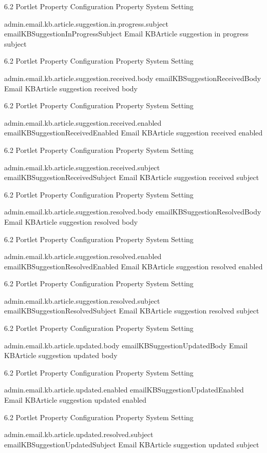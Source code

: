6.2 Portlet Property Configuration Property System Setting

admin.email.kb.article.suggestion.in.progress.subject
emailKBSuggestionInProgressSubject Email KBArticle suggestion in
progress subject

6.2 Portlet Property Configuration Property System Setting

admin.email.kb.article.suggestion.received.body
emailKBSuggestionReceivedBody Email KBArticle suggestion received body

6.2 Portlet Property Configuration Property System Setting

admin.email.kb.article.suggestion.received.enabled
emailKBSuggestionReceivedEnabled Email KBArticle suggestion received
enabled

6.2 Portlet Property Configuration Property System Setting

admin.email.kb.article.suggestion.received.subject
emailKBSuggestionReceivedSubject Email KBArticle suggestion received
subject

6.2 Portlet Property Configuration Property System Setting

admin.email.kb.article.suggestion.resolved.body
emailKBSuggestionResolvedBody Email KBArticle suggestion resolved body

6.2 Portlet Property Configuration Property System Setting

admin.email.kb.article.suggestion.resolved.enabled
emailKBSuggestionResolvedEnabled Email KBArticle suggestion resolved
enabled

6.2 Portlet Property Configuration Property System Setting

admin.email.kb.article.suggestion.resolved.subject
emailKBSuggestionResolvedSubject Email KBArticle suggestion resolved
subject

6.2 Portlet Property Configuration Property System Setting

admin.email.kb.article.updated.body emailKBSuggestionUpdatedBody Email
KBArticle suggestion updated body

6.2 Portlet Property Configuration Property System Setting

admin.email.kb.article.updated.enabled emailKBSuggestionUpdatedEnabled
Email KBArticle suggestion updated enabled

6.2 Portlet Property Configuration Property System Setting

admin.email.kb.article.updated.resolved.subject
emailKBSuggestionUpdatedSubject Email KBArticle suggestion updated
subject

